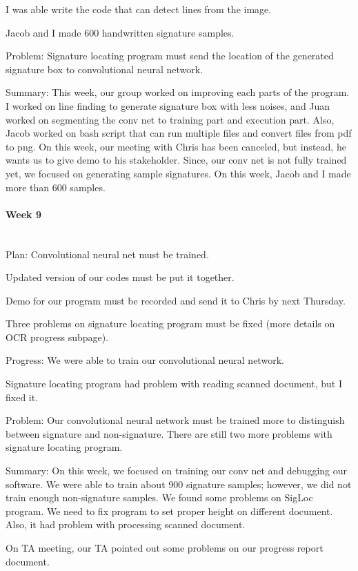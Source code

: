 \documentclass[article, onecolumn, draftclsnofoot,10pt, compsoc]{IEEEtran}
\begin{document}
I was able write the code that can detect lines from the image.

Jacob and I made 600 handwritten signature samples.
 
Problem: Signature locating program must send the location of the generated signature box to convolutional neural network.

Summary: This week, our group worked on improving each parts of the program. I worked on line finding to generate signature box with less noises, and Juan worked on segmenting the conv net to training part and execution part. Also, Jacob worked on bash script that can run multiple files and convert files from pdf to png. On this week, our meeting with Chris has been canceled, but instead, he wants us to give demo to his stakeholder. Since, our conv net is not fully trained yet, we focused on generating sample signatures. On this week, Jacob and I made more than 600 samples.

\paragraph{Week 9}
\mbox{}\\
Plan: Convolutional neural net must be trained.

Updated version of our codes must be put it together.

Demo for our program must be recorded and send it to Chris by next Thursday.

Three problems on signature locating program must be fixed (more details on OCR progress subpage).
 
Progress: We were able to train our convolutional neural network.

Signature locating program had problem with reading scanned document, but I fixed it.
 
Problem: Our convolutional neural network must be trained more to distinguish between signature and non-signature. There are still two more problems with signature locating program.

Summary: On this week, we focused on training our conv net and debugging our software. We were able to train about 900 signature samples; however, we did not train enough non-signature samples. We found some problems on SigLoc program. We need to fix program to set proper height on different document. Also, it had problem with processing scanned document.

On TA meeting, our TA pointed out some problems on our progress report document.
\end{document}

